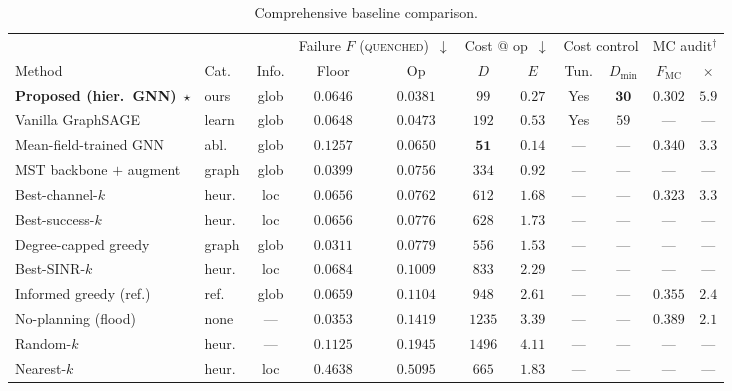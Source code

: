 \documentclass[journal]{IEEEtran}
\newcommand{\qq}{\textsc{quenched}}
\begin{document}
\begin{table}[t]
  \centering
  \caption{Comprehensive baseline comparison.}
  \label{tab:baselinecomp}
  \footnotesize
  \setlength{\tabcolsep}{3.5pt}
  \begin{tabular}{llccccccccc}
    \toprule
     &  &  & \multicolumn{2}{c}{Failure $F$ (\qq{})~$\downarrow$} & \multicolumn{2}{c}{Cost @ op~$\downarrow$} & \multicolumn{2}{c}{Cost control} & \multicolumn{2}{c}{MC audit$^{\dagger}$} \\
    \cmidrule(lr){4-5}\cmidrule(lr){6-7}\cmidrule(lr){8-9}\cmidrule(lr){10-11}
    Method & Cat. & Info. & Floor & Op & $D$ & $E$ & Tun. & $D_{\min}$ & $F_{\mathrm{MC}}$ & $\times$ \\
    \midrule
    \textbf{Proposed (hier.\ GNN)}~$\star$ & ours  & glob & $0.0646$ & $\mathbf{0.0381}$ & $99$  & $0.27$ & Yes & $\mathbf{30}$ & $\mathbf{0.302}$ & $5.9$ \\
    Vanilla GraphSAGE          & learn & glob & $0.0648$          & $0.0473$ & $192$         & $0.53$          & Yes & $59$ & ---     & ---   \\
    Mean-field-trained GNN     & abl.\ & glob & $0.1257$          & $0.0650$ & $\mathbf{51}$ & $\mathbf{0.14}$ & --- & ---  & $0.340$ & $3.3$ \\
    MST backbone $+$ augment   & graph & glob & $0.0399$          & $0.0756$ & $334$         & $0.92$          & --- & ---  & ---     & ---   \\
    Best-channel-$k$           & heur.\ &loc  & $0.0656$          & $0.0762$ & $612$         & $1.68$          & --- & ---  & $0.323$ & $3.3$ \\
    Best-success-$k$           & heur.\ &loc  & $0.0656$          & $0.0776$ & $628$         & $1.73$          & --- & ---  & ---     & ---   \\
    Degree-capped greedy       & graph & glob & $\mathbf{0.0311}$ & $0.0779$ & $556$         & $1.53$          & --- & ---  & ---     & ---   \\
    Best-SINR-$k$              & heur.\ &loc  & $0.0684$          & $0.1009$ & $833$         & $2.29$          & --- & ---  & ---     & ---   \\
    Informed greedy (ref.)     & ref.\ & glob & $0.0659$          & $0.1104$ & $948$         & $2.61$          & --- & ---  & $0.355$ & $2.4$ \\
    No-planning (flood)        & none  & ---  & $0.0353$          & $0.1419$ & $1235$        & $3.39$          & --- & ---  & $0.389$ & $2.1$ \\
    Random-$k$                & heur.\ &---  & $0.1125$          & $0.1945$ & $1496$        & $4.11$          & --- & ---  & ---     & ---   \\
    Nearest-$k$               & heur.\ &loc  & $0.4638$          & $0.5095$ & $665$         & $1.83$          & --- & ---  & ---     & ---   \\
    \bottomrule
  \end{tabular}
\end{table}
\end{document}
